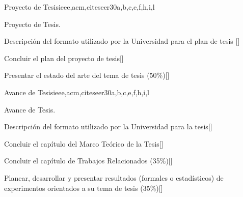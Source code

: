 \begin{syllabus}
\begin{unit}{Proyecto de Tesis}{}{ieee,acm,citeseer}{30}{a,b,c,e,f,h,i,l}
   \begin{topics}
      \item Proyecto de Tesis.
   \end{topics}
   \begin{learningoutcomes}
      \item Descripción del formato utilizado por la Universidad para el plan de tesis [\Assessment]
      \item Concluir el plan del proyecto de tesis[\Assessment]
      \item Presentar el estado del arte del tema de tesis (50\%)[\Assessment]
   \end{learningoutcomes}
\end{unit}

\begin{unit}{Avance de Tesis}{}{ieee,acm,citeseer}{30}{a,b,c,e,f,h,i,l}
   \begin{topics}
      \item Avance de Tesis.
   \end{topics}
   \begin{learningoutcomes}
      \item Descripción del formato utilizado por la Universidad para la tesis[\Assessment]
      \item Concluir el capítulo del Marco Teórico de la Tesis[\Assessment]
      \item Concluir el capítulo de Trabajos Relacionados (35\%)[\Assessment]
      \item Planear, desarrollar y presentar resultados (formales o estadísticos) de experimentos orientados a su tema de tesis (35\%)[\Assessment]
   \end{learningoutcomes}
\end{unit}

\begin{coursebibliography}
\end{coursebibliography}
\end{syllabus}
